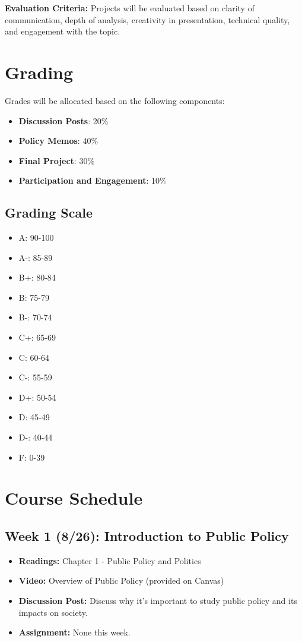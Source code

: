 \documentclass[12pt, letterpaper]{article}
\begin{document}
\textbf{Evaluation Criteria:} Projects will be evaluated based on clarity of communication, depth of analysis, creativity in presentation, technical quality, and engagement with the topic.

\section*{Grading}
Grades will be allocated based on the following components:
\begin{itemize}
    \item \textbf{Discussion Posts}: 20\%
    \item \textbf{Policy Memos}: 40\%
    \item \textbf{Final Project}: 30\%
    \item \textbf{Participation and Engagement}: 10\%
\end{itemize}

\subsection*{Grading Scale}

\begin{itemize}
    \item A: 90-100
    \item A-: 85-89
    \item B+: 80-84
    \item B: 75-79
    \item B-: 70-74
    \item C+: 65-69
    \item C: 60-64
    \item C-: 55-59
    \item D+: 50-54
    \item D: 45-49
    \item D-: 40-44
    \item F: 0-39
\end{itemize}

\section*{Course Schedule}
\subsection*{Week 1 (8/26): Introduction to Public Policy}
\begin{itemize}
    \item \textbf{Readings:} Chapter 1 - Public Policy and Politics
    \item \textbf{Video:} Overview of Public Policy (provided on Canvas)
    \item \textbf{Discussion Post:} Discuss why it's important to study public policy and its impacts on society.
    \item \textbf{Assignment:} None this week.
\end{itemize}
\end{document}

